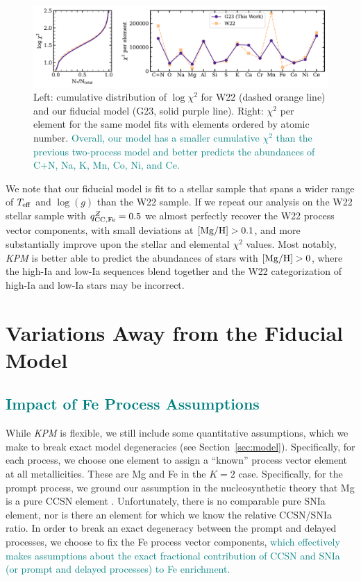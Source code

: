 \documentclass[modern]{aastex631}
\newcommand{\mgh}{[{\rm Mg}/{\rm H}]}
\newcommand{\logg}{\log(g)}
\newcommand{\teff}{T_{\rm eff}}
\newcommand{\qccFe}{q_{{\rm CC, Fe}}^{Z}}
\newcommand{\add}[1]{\textcolor{teal}{#1}}
\newcommand{\name}{\textsl{KPM}}
\begin{document}
\begin{figure}[htb!]
    \centering
    \includegraphics[width=\textwidth]{Paper/Figures/comp_w22.pdf}
    \caption{Left: cumulative distribution of $\log \chi^2$ for W22 (dashed orange line) and our fiducial model (G23, solid purple line). Right: $\chi^2$ per element for the same model fits with elements ordered by atomic number. \add{Overall, our model has a smaller cumulative $\chi^2$ than the previous two-process model and better predicts the abundances of C+N, Na, K, Mn, Co, Ni, and Ce.}}
    \label{fig:comp_w22}
\end{figure}

We note that our fiducial model is fit to a stellar sample that spans a wider range of $\teff$ and $\logg$ than the W22 sample. If we repeat our analysis on the W22 stellar sample with $\qccFe=0.5$ we almost perfectly recover the W22 process vector components, with small deviations at $\mgh>0.1$, and more substantially improve upon the stellar and elemental $\chi^2$ values. Most notably, \name{} is better able to predict the abundances of stars with $\mgh>0$, where the high-Ia and low-Ia sequences blend together and the W22 categorization of high-Ia and low-Ia stars may be incorrect.

\section{Variations Away from the Fiducial Model} \label{sec:variations}

\subsection{\add{Impact of Fe Process Assumptions}} \label{subsec:qccFe}

While \name{} is flexible, we still include some quantitative assumptions, which we make to break exact model degeneracies (see Section~\ref{sec:model}).
Specifically, for each process, we choose one element to assign a ``known'' process vector element at all metallicities.
These are Mg and Fe in the $K=2$ case.
Specifically, for the prompt process, we ground our assumption in the nucleosynthetic theory that Mg is a pure CCSN element \citep[e.g.,][]{andrews2017}.
Unfortunately, there is no comparable pure SNIa element, nor is there an element for which we know the relative CCSN/SNIa ratio.
In order to break an exact degeneracy between the prompt and delayed processes, we choose to fix the Fe process vector components, \add{which effectively makes assumptions about the exact fractional contribution of CCSN and SNIa (or prompt and delayed processes) to Fe enrichment.}
\end{document}
